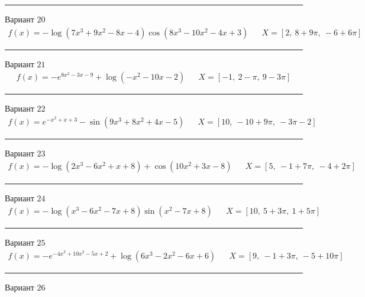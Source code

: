 \documentclass[11pt]{report}
\begin{document}
\begin{center}
    \noindent\rule{8cm}{0.4pt}
\end{center}
Вариант \(20\)
\begin{align*}
    f(x) = - \log{\left(7 x^{3} + 9 x^{2} - 8 x - 4 \right)} \cos{\left(8 x^{3} - 10 x^{2} - 4 x + 3 \right)} && X = \left[ 2, \  8 + 9 \pi, \  -6 + 6 \pi\right]
\end{align*}
\begin{center}
    \noindent\rule{8cm}{0.4pt}
\end{center}
Вариант \(21\)
\begin{align*}
    f(x) = - e^{8 x^{2} - 3 x - 9} + \log{\left(- x^{2} - 10 x - 2 \right)} && X = \left[ -1, \  2 - \pi, \  9 - 3 \pi\right]
\end{align*}
\begin{center}
    \noindent\rule{8cm}{0.4pt}
\end{center}
Вариант \(22\)
\begin{align*}
    f(x) = e^{- x^{2} + x + 3} - \sin{\left(9 x^{3} + 8 x^{2} + 4 x - 5 \right)} && X = \left[ 10, \  -10 + 9 \pi, \  - 3 \pi - 2\right]
\end{align*}
\begin{center}
    \noindent\rule{8cm}{0.4pt}
\end{center}
Вариант \(23\)
\begin{align*}
    f(x) = - \log{\left(2 x^{3} - 6 x^{2} + x + 8 \right)} + \cos{\left(10 x^{2} + 3 x - 8 \right)} && X = \left[ 5, \  -1 + 7 \pi, \  -4 + 2 \pi\right]
\end{align*}
\begin{center}
    \noindent\rule{8cm}{0.4pt}
\end{center}
Вариант \(24\)
\begin{align*}
    f(x) = - \log{\left(x^{3} - 6 x^{2} - 7 x + 8 \right)} \sin{\left(x^{2} - 7 x + 8 \right)} && X = \left[ 10, \  5 + 3 \pi, \  1 + 5 \pi\right]
\end{align*}
\begin{center}
    \noindent\rule{8cm}{0.4pt}
\end{center}
Вариант \(25\)
\begin{align*}
    f(x) = - e^{- 4 x^{3} + 10 x^{2} - 5 x + 2} + \log{\left(6 x^{3} - 2 x^{2} - 6 x + 6 \right)} && X = \left[ 9, \  -1 + 3 \pi, \  -5 + 10 \pi\right]
\end{align*}
\begin{center}
    \noindent\rule{8cm}{0.4pt}
\end{center}
Вариант \(26\)
\end{document}
